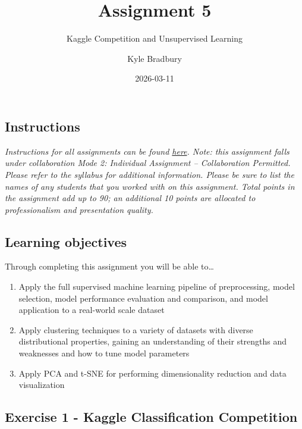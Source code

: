 \documentclass[
  letterpaper,
  DIV=11,
  numbers=noendperiod]{scrartcl}
\title{Assignment 5}
\subtitle{Kaggle Competition and Unsupervised Learning}
\author{Kyle Bradbury}
\date{2026-03-11}
\providecommand{\tightlist}{%
  \setlength{\itemsep}{0pt}\setlength{\parskip}{0pt}}\usepackage{longtable,booktabs,array}
\renewcommand*\contentsname{Table of contents}
\newcommand\contentsname{Table of contents}
\begin{document}
\maketitle

\renewcommand*\contentsname{Table of contents}
{
\hypersetup{linkcolor=}
\setcounter{tocdepth}{1}
\tableofcontents
}

\subsection{Instructions}\label{instructions}

\emph{Instructions for all assignments can be found
\href{https://kylebradbury.github.io/ids705/notebooks/assignment_instructions.html}{here}.
Note: this assignment falls under collaboration Mode 2: Individual
Assignment -- Collaboration Permitted. Please refer to the syllabus for
additional information. Please be sure to list the names of any students
that you worked with on this assignment. Total points in the assignment
add up to 90; an additional 10 points are allocated to professionalism
and presentation quality.}

\subsection{Learning objectives}\label{learning-objectives}

Through completing this assignment you will be able to\ldots{}

\begin{enumerate}
\def\labelenumi{\arabic{enumi}.}
\tightlist
\item
  Apply the full supervised machine learning pipeline of preprocessing,
  model selection, model performance evaluation and comparison, and
  model application to a real-world scale dataset
\item
  Apply clustering techniques to a variety of datasets with diverse
  distributional properties, gaining an understanding of their strengths
  and weaknesses and how to tune model parameters
\item
  Apply PCA and t-SNE for performing dimensionality reduction and data
  visualization
\end{enumerate}

\subsection{Exercise 1 - Kaggle Classification
Competition}\label{exercise-1---kaggle-classification-competition}
\end{document}
